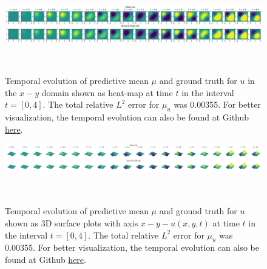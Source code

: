 \documentclass{article}
\begin{document}
\begin{figure}
    \centering
    \includegraphics[width=1\textwidth]{../final_examples/wave_equation/wave_3d.png}
    \caption{Temporal evolution of predictive mean $\mu$ and ground truth for $u$ in the $x-y$ domain shown as heat-map at time $t$ in the interval $t=[0,4]$. The total relative $L^2$ error for $\mu_u$ was 0.00355. For better visualization, the temporal evolution can also be found at Github \href{https://github.com/TobiLeitgeb/Code_bac/tree/main/final_examples/wave_equation/movie files}{here}.}

    ~\label{fig:wave_contour}
\end{figure}
\begin{figure}
    \centering
    \includegraphics[width=1\textwidth]{../final_examples/wave_equation/wave_3d_durfacec.png}
    \caption{Temporal evolution of predictive mean $\mu$ and ground truth for $u$ shown as 3D surface plots with axis $x-y-u(x,y,t)$ at time $t$ in the interval $t=[0,4]$. The total relative $L^2$ error for $\mu_u$ was 0.00355. For better visualization, the temporal evolution can also be found at Github \href{https://github.com/TobiLeitgeb/Code_bac/tree/main/final_examples/wave_equation/movie files}{here}.}
    ~\label{fig:wave_surface}
\end{figure}
\newpage
\end{document}
